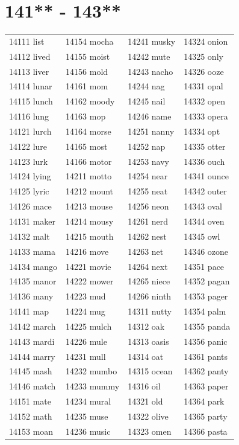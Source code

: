 \documentclass[10pt, oneside]{book}
\begin{document}
\begin{table}
	\centering
	\section*{141** - 143**}
	\begin{tabular}{l l l l}
14111 list &14154 mocha &14241 musky &14324 onion\\
14112 lived &14155 moist &14242 mute &14325 only\\
14113 liver &14156 mold &14243 nacho &14326 ooze\\
14114 lunar &14161 mom &14244 nag &14331 opal\\
14115 lunch &14162 moody &14245 nail &14332 open\\
14116 lung &14163 mop &14246 name &14333 opera\\
14121 lurch &14164 morse &14251 nanny &14334 opt\\
14122 lure &14165 most &14252 nap &14335 otter\\
14123 lurk &14166 motor &14253 navy &14336 ouch\\
14124 lying &14211 motto &14254 near &14341 ounce\\
14125 lyric &14212 mount &14255 neat &14342 outer\\
14126 mace &14213 mouse &14256 neon &14343 oval\\
14131 maker &14214 mousy &14261 nerd &14344 oven\\
14132 malt &14215 mouth &14262 nest &14345 owl\\
14133 mama &14216 move &14263 net &14346 ozone\\
14134 mango &14221 movie &14264 next &14351 pace\\
14135 manor &14222 mower &14265 niece &14352 pagan\\
14136 many &14223 mud &14266 ninth &14353 pager\\
14141 map &14224 mug &14311 nutty &14354 palm\\
14142 march &14225 mulch &14312 oak &14355 panda\\
14143 mardi &14226 mule &14313 oasis &14356 panic\\
14144 marry &14231 mull &14314 oat &14361 pants\\
14145 mash &14232 mumbo &14315 ocean &14362 panty\\
14146 match &14233 mummy &14316 oil &14363 paper\\
14151 mate &14234 mural &14321 old &14364 park\\
14152 math &14235 muse &14322 olive &14365 party\\
14153 moan &14236 music &14323 omen &14366 pasta\\
	\end{tabular}
 \end{table}
\clearpage
\end{document}
